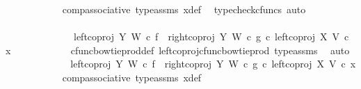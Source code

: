 \begin{isabellebody}
\ \ \ \ \ \ \ \ \ \ \isamarkupfalse%
\ comp{\isacharunderscore}{\kern0pt}associative{}\ type{\isacharunderscore}{\kern0pt}assms{\isacharparenleft}{\kern0pt}{}{\isacharparenright}{\kern0pt}\ x{}{\isacharunderscore}{\kern0pt}def\ \isamarkupfalse%
\ {\isacharparenleft}{\kern0pt}typecheck{\isacharunderscore}{\kern0pt}cfuncs{\isacharcomma}{\kern0pt}\ auto{\isacharparenright}{\kern0pt}\isanewline
\ \ \ \ \ \ \ \ \isamarkupfalse%
\ \isamarkupfalse%
\ {\isachardoublequoteopen}{\isachardot}{\kern0pt}{\isachardot}{\kern0pt}{\isachardot}{\kern0pt}\ {\isacharequal}{\kern0pt}\isanewline
\ \ \ \ \ \ \ \ \ \ \ \ \ \ {\isacharparenleft}{\kern0pt}{\isacharparenleft}{\kern0pt}{\isacharparenleft}{\kern0pt}left{\isacharunderscore}{\kern0pt}coproj\ Y\ W\ {\isasymcirc}\isactrlsub c\ f{\isacharparenright}{\kern0pt}\ {\isasymamalg}\ {\isacharparenleft}{\kern0pt}right{\isacharunderscore}{\kern0pt}coproj\ Y\ W\ {\isasymcirc}\isactrlsub c\ g{\isacharparenright}{\kern0pt}{\isacharparenright}{\kern0pt}\ {\isasymcirc}\isactrlsub c\ left{\isacharunderscore}{\kern0pt}coproj\ X\ V{\isacharparenright}{\kern0pt}\ {\isasymcirc}\isactrlsub c\ x{}{\isachardoublequoteclose}\isanewline
\ \ \ \ \ \ \ \ \ \ \isamarkupfalse%
\ cfunc{\isacharunderscore}{\kern0pt}bowtie{\isacharunderscore}{\kern0pt}prod{\isacharunderscore}{\kern0pt}def{}\ left{\isacharunderscore}{\kern0pt}coproj{\isacharunderscore}{\kern0pt}cfunc{\isacharunderscore}{\kern0pt}bowtie{\isacharunderscore}{\kern0pt}prod\ type{\isacharunderscore}{\kern0pt}assms\ \isamarkupfalse%
\ auto\isanewline
\ \ \ \ \ \ \ \ \isamarkupfalse%
\ \isamarkupfalse%
\ {\isachardoublequoteopen}{\isachardot}{\kern0pt}{\isachardot}{\kern0pt}{\isachardot}{\kern0pt}\ {\isacharequal}{\kern0pt}\ {\isacharparenleft}{\kern0pt}{\isacharparenleft}{\kern0pt}left{\isacharunderscore}{\kern0pt}coproj\ Y\ W\ {\isasymcirc}\isactrlsub c\ f{\isacharparenright}{\kern0pt}\ {\isasymamalg}\ {\isacharparenleft}{\kern0pt}right{\isacharunderscore}{\kern0pt}coproj\ Y\ W\ {\isasymcirc}\isactrlsub c\ g{\isacharparenright}{\kern0pt}{\isacharparenright}{\kern0pt}\ {\isasymcirc}\isactrlsub c\ left{\isacharunderscore}{\kern0pt}coproj\ X\ V\ {\isasymcirc}\isactrlsub c\ x{}{\isachardoublequoteclose}\isanewline
\ \ \ \ \ \ \ \ \ \ \isamarkupfalse%
\ comp{\isacharunderscore}{\kern0pt}associative{}\ type{\isacharunderscore}{\kern0pt}assms\ x{}{\isacharunderscore}{\kern0pt}def\ \isamarkupfalse%

\end{isabellebody}
